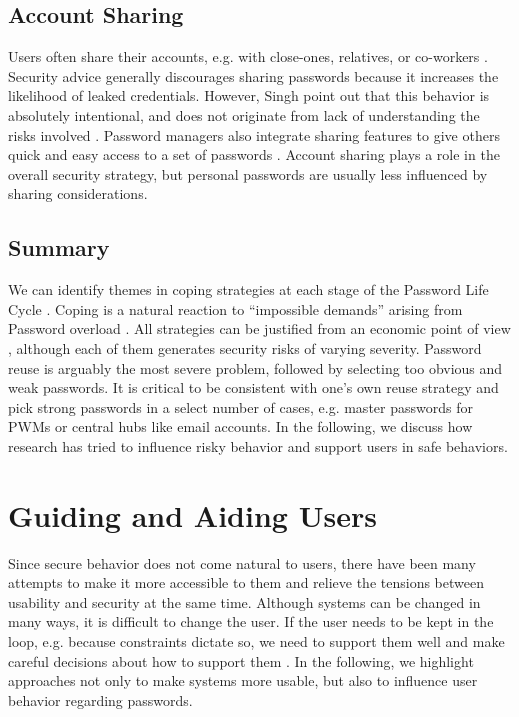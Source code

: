 	\subsection{Account Sharing}
	Users often share their accounts, e.g. with close-ones, relatives, or co-workers \cite{Kaye2011PasswordSharing, Shay2010EncounteringPasswordRequirements}. Security advice generally discourages sharing passwords because it increases the likelihood of leaked credentials. However, Singh \etal point out that this behavior is absolutely intentional, and does not originate from lack of understanding the risks involved \cite{Singh2007PasswordSharing}. Password managers also integrate sharing features to give others quick and easy access to a set of passwords \cite{Li2014EmperorsNewPWM}. Account sharing plays a role in the overall security strategy, but personal passwords are usually less influenced by sharing considerations. 

	\subsection{Summary}
	We can identify themes in coping strategies at each stage of the Password Life Cycle \cite{Stobert2014PasswordLifeCycle}. Coping is a natural reaction to ``impossible demands'' arising from Password overload \cite{Sasse2005UsableSecurityPosition}. All strategies can be justified from an economic point of view \cite{Florencio2014PasswordPortfoliosFiniteUser}, although each of them generates security risks of varying severity. Password reuse is arguably the most severe problem, followed by selecting too obvious and weak passwords. It is critical to be consistent with one's own reuse strategy and pick strong passwords in a select number of cases, e.g. master passwords for \glspl{PWM} or central hubs like email accounts. In the following, we discuss how research has tried to influence risky behavior and support users in safe behaviors. 

\section{Guiding and Aiding Users}\label{sec:rw:user-support-interventions}
Since secure behavior does not come natural to users, there have been many attempts to make it more accessible to them and relieve the tensions between usability and security at the same time. Although systems can be changed in many ways, it is difficult to change the user. If the user needs to be kept in the loop, e.g. because constraints dictate so, we need to support them well and make careful decisions about how to support them \cite{Cranor2008FrameworkReasoning}. In the following, we highlight approaches not only to make systems more usable, but also to influence user behavior regarding passwords. 
